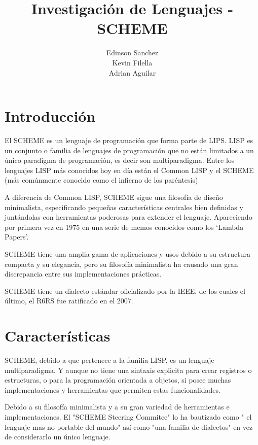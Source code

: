 \documentclass[11pt]{article} %
\title{Investigación de Lenguajes - SCHEME}
\author{Edinson Sanchez\\Kevin Filella\\Adrian Aguilar}
\begin{document}
\maketitle

\section{Introducción}
El SCHEME es un lenguaje de programación que forma parte de LIPS. LISP es un conjunto o familia de lenguajes de programación que no están limitados a un único paradigma de programación, es decir son multiparadigma. Entre los lenguajes LISP más conocidos hoy en día están el Common LISP y el SCHEME (más comúnmente conocido como el infierno de los paréntesis)

A diferencia de Common LISP, SCHEME sigue una filosofía de diseño minimalista, especificando pequeñas características centrales bien definidas  y juntándolas con herramientas poderosas para extender el lenguaje. Apareciendo por primera vez en 1975 en una serie de memos conocidos como los ‘Lambda Papers’.

SCHEME tiene una amplia gama de aplicaciones y usos debido a su estructura compacta y su elegancia, pero su filosofía minimalista ha causado una gran discrepancia entre sus implementaciones prácticas.

SCHEME tiene un dialecto estándar oficializado por la IEEE, de los cuales el último, el R6RS fue ratificado en el 2007.

\section{Características}

SCHEME, debido a que pertenece a la familia LISP, es un lenguaje multiparadigma. Y aunque no tiene una sintaxis explicita para crear registros o estructuras, o para la programación orientada a objetos, si posee muchas implementaciones y herramientas que permiten estas funcionalidades.

Debido a su filosofía minimalista y a su gran variedad de herramientas e implementaciones. El  "SCHEME Steering Commitee"  lo ha bautizado como " el lenguaje mas no-portable del mundo"  así como "una familia de dialectos" en vez de considerarlo un único lenguaje.
\end{document}
